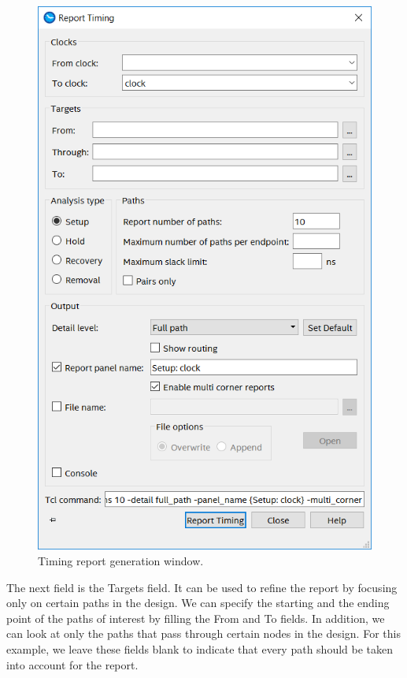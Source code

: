 \documentclass[11pt, twoside, pdftex]{article}
\begin{document}
\begin{figure}[H]
\begin{center}
\includegraphics[scale=0.5]{figures/figure9.png}
\end{center}
\caption{Timing report generation window.}
\label{fig:9}
\end{figure}

The next field is the {\sf Targets} field. It can be used to refine the report by focusing 
only on certain paths in the design. We can specify the starting
and the ending point of the paths of interest by filling the {\sf From} and {\sf To} fields. 
In addition, we can look at only the paths that pass through certain
nodes in the design. For this example, we leave these fields blank to indicate that every path 
should be taken into account for the report.
\end{document}
